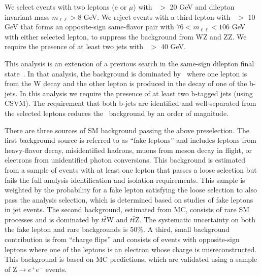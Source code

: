 We select events with two leptons (e or $\mu$) with \pt\ $>$ 20 GeV and dilepton invariant mass $m_{\ell\ell}>8$ GeV. 
We reject events with a third lepton with \pt\ $>$ 10 GeV that forms an opposite-sign
same-flavor pair with $76 < m_{\ell\ell} < 106$ GeV with either selected lepton, to suppress
the background from WZ and ZZ. We require the presence of at least two jets with \pt\ $>$ 40 GeV.

This analysis is an extension of a previous search in the same-sign dilepton final state~\cite{ref:ss_inclusive}.
In that analysis, the background is dominated by \ttljets\ where one lepton is from the W decay and the other
lepton is produced in the decay of one of the b-jets. In this analysis we require the presence of at least two
b-tagged jets (using CSVM). The requirement that both b-jets are identified and well-separated from the selected leptons
reduces the \ttljets\ background by an order of magnitude. 


There are three sources of SM background passing the above preselection. 
The first background source is referred to as ``fake leptons'' and includes leptons from heavy-flavor decay, 
misidentified hadrons, muons from meson decay in flight, or electrons from unidentified photon conversions. 
This background is estimated from a sample of events with at least one lepton that passes a loose selection 
but fails the full analysis identification and isolation requirements. This sample is weighted by the probability 
for a fake lepton satisfying the loose selection to also pass the analysis selection, which is determined based 
on studies of fake 
leptons in jet events. The second background, estimated from MC, consists of rare SM processes and is dominated 
by $t\bar{t}$W and $t\bar{t}$Z. The systematic uncertainty on both the fake lepton and rare backgrounds is 50\%. 
A third, small background contribution is from ``charge flips'' and consists of events with opposite-sign leptons 
where one of the leptons is an electron whose charge is misreconstructed. This background is based on MC predictions,
which are validated using a sample of Z$\to e^+e^-$ events.

